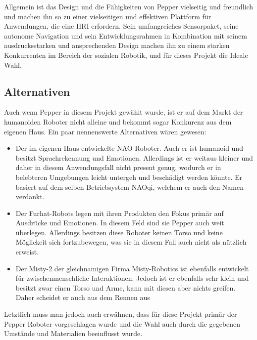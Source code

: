 Allgemein ist das Design und die Fähigkeiten von Pepper vielseitig und freundlich und machen ihn so zu einer vielseitigen und effektiven Plattform für Anwendungen, die eine \ac{HRI} erfordern. Sein umfangreiches Sensorpaket, seine autonome Navigation und sein Entwicklungsrahmen in Kombination mit seinem ausdrucksstarken und ansprechenden Design machen ihn zu einem starken Konkurrenten im Bereich der sozialen Robotik, und für dieses Projekt die Ideale Wahl.

\subsection{Alternativen}
Auch wenn Pepper in diesem Projekt gewählt wurde, ist er auf dem Markt der humanoiden Roboter nicht alleine und bekommt sogar Konkurenz aus dem eigenen Haus. Ein paar nennenswerte Alternativen wären gewesen:
\begin{itemize}
    \item Der im eigenen Haus entwickelte NAO Roboter. Auch er ist humanoid und besitzt Sprachrekennung und Emotionen. Allerdings ist er weitaus kleiner und daher in diesem Anwendungsfall nicht present genug, wodurch er in belebteren Umgebungen leicht untergeh und beschädigt werden könnte. Er basiert auf dem selben Betriebsystem NAOqi, welchem er auch den Namen verdankt.
    \item Der Furhat-Robots legen mit ihren Produkten den Fokus primär auf Ausdrücke und Emotionen. In diesem Feld sind sie Pepper auch weit überlegen. Allerdings besitzen diese Roboter keinen Torso und keine Möglickeit sich fortzubewegen, was sie in diesem Fall auch nicht als nützlich erweist.
    \item Der Misty-2 der gleichnamigen Firma Misty-Robotics ist ebenfalls entwickelt für zwischenmenschliche Interaktionen. Jedoch ist er ebenfalls sehr klein und besitzt zwar einen Torso und Arme, kann mit diesen aber nichts greifen. Daher scheidet er auch aus dem Rennen aus
\end{itemize}
Letztlich muss man jedoch auch erwähnen, dass für diese Projekt primär der Pepper Roboter vorgeschlagen wurde und die Wahl auch durch die gegebenen Umstände und Materialien beeinflusst wurde.


